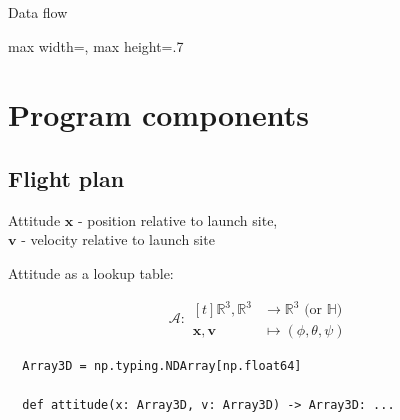 \documentclass{beamer}
\begin{document}
\begin{frame}{Data flow}
\begin{adjustbox}{max width=\textwidth, max height=.7\textheight}
  \end{adjustbox}
\end{frame}

\section{Program components}

\subsection{Flight plan}
\begin{frame}[fragile]{Attitude}
  $\mathbf x$ - position relative to launch site, \\
  $\mathbf v$ - velocity relative to launch site

  \vspace{\baselineskip}

  Attitude as a lookup table:

  \begin{equation}
    \mathcal A:
    \begin{aligned}[t]
      \mathbb R^3, \mathbb R^3
      & \to \mathbb R^3 \text{ (or $\mathbb H$)} \\
    \mathbf x, \mathbf v & \mapsto (\phi, \theta, \psi)
    \end{aligned}
  \end{equation}

  \vspace{\baselineskip}

  \begin{lstlisting}
  Array3D = np.typing.NDArray[np.float64]

  def attitude(x: Array3D, v: Array3D) -> Array3D: ...
  \end{lstlisting}
\end{frame}
\end{document}
